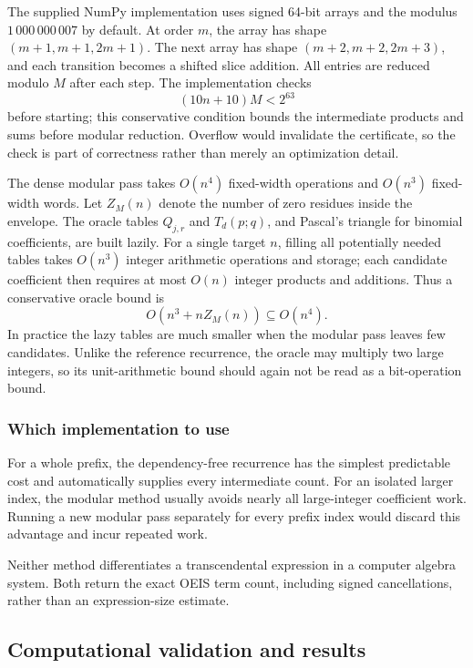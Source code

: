 \documentclass[11pt,a4paper]{article}
\numberwithin{equation}{section}
\theoremstyle{definition}
\theoremstyle{remark}
\theoremstyle{plain}
\begin{document}
The supplied NumPy implementation uses signed 64-bit arrays and the modulus
$1\,000\,000\,007$ by default. At order $m$, the array has shape
$(m+1,m+1,2m+1)$. The next array has shape
$(m+2,m+2,2m+3)$, and each transition becomes a shifted slice addition.
All entries are reduced modulo $M$ after each step. The implementation checks
\[
 (10n+10)M<2^{63}
\]
before starting; this conservative condition bounds the intermediate
products and sums before modular reduction. Overflow would invalidate the
certificate, so the check is part of correctness rather than merely an
optimization detail.

The dense modular pass takes $O(n^4)$ fixed-width operations and $O(n^3)$
fixed-width words. Let $Z_M(n)$ denote the number of zero residues inside
the envelope. The oracle tables $Q_{j,r}$ and $T_d(p;q)$, and Pascal's
triangle for binomial coefficients, are built lazily. For a single target
$n$, filling all potentially needed tables takes $O(n^3)$ integer arithmetic
operations and storage; each candidate coefficient then requires at most
$O(n)$ integer products and additions. Thus a conservative oracle bound is
\[
 O(n^3+nZ_M(n))\subseteq O(n^4).
\]
In practice the lazy tables are much smaller when the modular pass leaves
few candidates. Unlike the reference recurrence, the oracle may multiply
two large integers, so its unit-arithmetic bound should again not be read
as a bit-operation bound.

\subsubsection{Which implementation to use}

For a whole prefix, the dependency-free recurrence has the simplest predictable
cost and automatically supplies every intermediate count. For an isolated
larger index, the modular method usually avoids nearly all large-integer
coefficient work. Running a new modular pass separately for every prefix
index would discard this advantage and incur repeated work.

Neither method differentiates a transcendental expression in a computer
algebra system. Both return the exact OEIS term count, including signed
cancellations, rather than an expression-size estimate.

\subsection{Computational validation and results}
\end{document}

